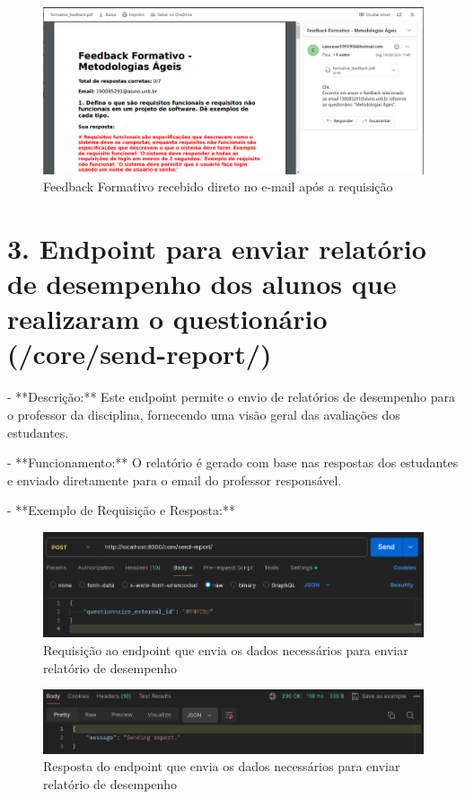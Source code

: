 \begin{figure}[H]
    \centering
    \includegraphics[width=1\textwidth]{figuras/feedback.png}
    \caption{Feedback Formativo recebido direto no e-mail após a requisição}
    \label{fig:report_questions}
\end{figure}

\section*{3. Endpoint para enviar relatório de desempenho dos alunos que realizaram o questionário (/core/send-report/)}

- **Descrição:** Este endpoint permite o envio de relatórios de desempenho para o professor da disciplina, fornecendo uma visão geral das avaliações dos estudantes.

- **Funcionamento:** O relatório é gerado com base nas respostas dos estudantes e enviado diretamente para o email do professor responsável.

- **Exemplo de Requisição e Resposta:**
  
\begin{figure}[H]
    \centering
    \includegraphics[width=1\textwidth]{figuras/send_report_teacher.png}
    \caption{Requisição ao endpoint que envia os dados necessários para enviar relatório de desempenho}
    \label{fig:report_questions}
\end{figure}

\begin{figure}[H]
    \centering
    \includegraphics[width=1\textwidth]{figuras/send_report_teacher_result.png}
    \caption{Resposta do endpoint que envia os dados necessários para enviar relatório de desempenho}
    \label{fig:report_questions}
\end{figure}

